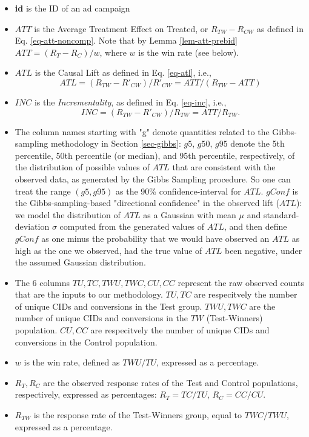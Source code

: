\documentclass[11pt,a4paper]{article}
\theoremstyle{definition}
\theoremstyle{remark}
\theoremstyle{definition}
\theoremstyle{definition}
\theoremstyle{definition}
\theoremstyle{definition}
\theoremstyle{definition}
\theoremstyle{definition}
\begin{document}
\begin{itemize}
	\item \textbf{id} is the ID of an ad campaign
	\item $ATT$ is the Average Treatment Effect on Treated, or $R_{TW} - R_{CW}$ as defined in Eq. \ref{eq-att-noncomp}. Note that by Lemma \ref{lem-att-prebid} $ATT = (R_T - R_C)/w$, where $w$ is the win rate (see below).
	\item $ATL$ is the Causal Lift as defined in Eq. \ref{eq-atl}, i.e., 
\begin{equation*}
	ATL = (R_{TW} - R'_{CW})/R'_{CW} = ATT/(R_{TW} - ATT) 
\end{equation*}
	\item $INC$ is the \textit{Incrementality}, as defined in Eq. \ref{eq-inc}, i.e., 
\begin{equation*}
	INC = (R_{TW} - R'_{CW})/R_{TW} = ATT/R_{TW}.
\end{equation*}

	\item The column names starting with "g" denote quantities related to the Gibbs-sampling methodology in Section \ref{sec-gibbs}: $g5$, $g50$, $g95$ denote the 5th percentile, 50th percentile (or median), and 95th percentile, respectively, of the distribution of possible values of $ATL$ that are consistent with the observed data, as generated by the Gibbs Sampling procedure. So one can treat the range $(g5, g95)$ as the 90\% confidence-interval for $ATL$. $gConf$ is the Gibbs-sampling-based "directional confidence" in the observed lift ($ATL$): we model the distribution of $ATL$ as a Gaussian with mean $\mu$ and standard-deviation $\sigma$ computed from the generated values of $ATL$, and then define $gConf$ as one minus the probability that we would have observed an $ATL$ as high as the one we observed, had the true value of $ATL$ been negative, under the assumed Gaussian distribution. 
	\item The 6 columns $TU, TC, TWU, TWC, CU, CC$ represent the raw observed counts that are the inputs to our methodology. $TU, TC$ are respecitvely the number of unique CIDs and conversions in the Test group. $TWU, TWC$ are the number of unique CIDs and conversions in the $TW$ (Test-Winners) population. $CU, CC$ are respecitvely the number of unique CIDs and conversions in the Control population. 
	\item $w$ is the win rate, defined as $TWU/TU$, expressed as a percentage.
	\item $R_T, R_C$ are the observed response rates of the Test and Control populations, respectively, expressed as percentages: $R_T = TC/TU$, $R_C = CC/CU$.
	\item $R_{TW}$ is the response rate of the Test-Winners group, equal to $TWC/TWU$, expressed as a percentage.
\end{itemize}
\end{document}
